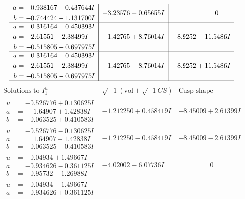 \documentclass[1p]{elsarticle_modified}
\theoremstyle{definition}
\newcommand{\I}{\sqrt{-1}}
\begin{document}
$$\begin{array}{c|c|c}
\begin{aligned}
a &= -0.938167 + 0.437644 I \\
b &= -0.744424 - 1.131700 I\end{aligned}
 & -3.23576 - 0.65655 I & \phantom{-0.000000 } 0 \\ \hline\begin{aligned}
u &= \phantom{-}0.316164 + 0.450393 I \\
a &= -2.61551 + 2.38499 I \\
b &= -0.515805 + 0.697975 I\end{aligned}
 & \phantom{-}1.42765 + 8.76014 I & -8.9252 - 11.6486 I \\ \hline\begin{aligned}
u &= \phantom{-}0.316164 - 0.450393 I \\
a &= -2.61551 - 2.38499 I \\
b &= -0.515805 - 0.697975 I\end{aligned}
 & \phantom{-}1.42765 - 8.76014 I & -8.9252 + 11.6486 I\\
 \hline 
 \end{array}$$\newpage$$\begin{array}{c|c|c}  
\text{Solutions to }I^u_{1}& \I (\text{vol} + \sqrt{-1}CS) & \text{Cusp shape}\\
 \hline 
\begin{aligned}
u &= -0.526776 + 0.130625 I \\
a &= \phantom{-}1.64907 + 1.42838 I \\
b &= -0.063525 + 0.410583 I\end{aligned}
 & -1.212250 + 0.458419 I & -8.45009 + 2.61399 I \\ \hline\begin{aligned}
u &= -0.526776 - 0.130625 I \\
a &= \phantom{-}1.64907 - 1.42838 I \\
b &= -0.063525 - 0.410583 I\end{aligned}
 & -1.212250 - 0.458419 I & -8.45009 - 2.61399 I \\ \hline\begin{aligned}
u &= -0.04934 + 1.49667 I \\
a &= -0.934626 - 0.361125 I \\
b &= -0.95732 - 1.26988 I\end{aligned}
 & -4.02002 - 6.07736 I & \phantom{-0.000000 } 0 \\ \hline\begin{aligned}
u &= -0.04934 - 1.49667 I \\
a &= -0.934626 + 0.361125 I \\

\end{aligned}
\end{array}$$
\end{document}
